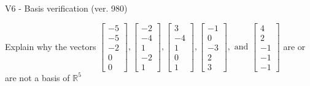 \begin{exercise}
  \begin{exerciseTitle}V6 - Basis verification (ver. 980)\end{exerciseTitle}
  \begin{exerciseStatement}
    Explain why the vectors \(\left[\begin{array}{r}
-5 \\
-5 \\
-2 \\
0 \\
0
\end{array}\right] , \left[\begin{array}{r}
-2 \\
-4 \\
1 \\
-2 \\
1
\end{array}\right] , \left[\begin{array}{r}
3 \\
-4 \\
1 \\
0 \\
1
\end{array}\right] , \left[\begin{array}{r}
-1 \\
0 \\
-3 \\
2 \\
3
\end{array}\right] , \text{ and } \left[\begin{array}{r}
4 \\
2 \\
-1 \\
-1 \\
-1
\end{array}\right]\) are or are not a basis of \(\mathbb{R}^5\)	



\end{exerciseStatement}
\end{exercise}

